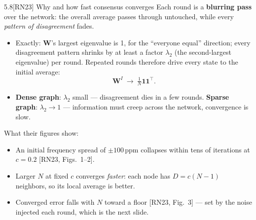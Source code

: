 \documentclass[10pt]{beamer}
\newcommand{\RN}[1]{\textcolor{blue!50!black}{[RN23#1]}}
\newcommand{\srcline}[1]{\par\vfill\noindent{\tiny\textcolor{gray}{Source: #1}}}
\begin{document}
\begin{frame}{5.8\quad \RN{} Why and how fast consensus converges}
\small
Each round is a \textbf{blurring pass} over the network: the overall
average passes through untouched, while every \emph{pattern of
disagreement} fades.
\vspace{0.5ex}
\begin{itemize}
\item Exactly: $\mathbf W$'s largest eigenvalue is 1, for the
``everyone equal'' direction; every disagreement pattern shrinks by at
least a factor $\lambda_2$ (the second-largest eigenvalue) per round.
Repeated rounds therefore drive every state to the initial average:
\[
\mathbf W^{I}\ \longrightarrow\ \tfrac1N\mathbf{11}^\top .
\]
\item \textbf{Dense graph}: $\lambda_2$ small --- disagreement dies in
a few rounds. \textbf{Sparse graph}: $\lambda_2\to1$ --- information
must creep across the network, convergence is slow.
\end{itemize}
\vspace{0.5ex}
What their figures show:
\begin{itemize}
\item An initial frequency spread of $\pm100$\,ppm collapses within
tens of iterations at $c=0.2$ \RN{, Figs.~1--2}.
\item Larger $N$ at fixed $c$ converges \emph{faster}: each node has
$D=c(N{-}1)$ neighbors, so its local average is better.
\item Converged error falls with $N$ toward a floor \RN{, Fig.~3} ---
set by the noise injected each round, which is the next slide.
\end{itemize}
\srcline{[RN23] \S III-A, Figs.~1--3.}
\end{frame}
\end{document}

